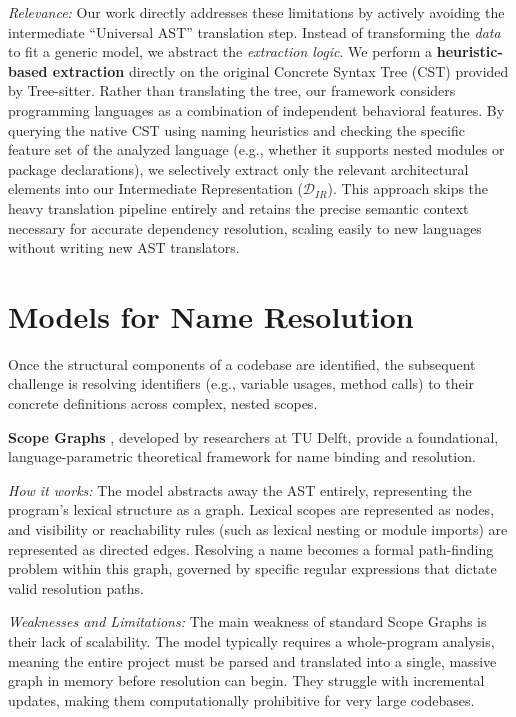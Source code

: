 \textit{Relevance:} Our work directly addresses these limitations by
actively avoiding the intermediate ``Universal AST'' translation step.
Instead of transforming the \textit{data} to fit a generic model, we
abstract the \textit{extraction logic}. We perform a
\textbf{heuristic-based extraction} directly on the original Concrete
Syntax Tree (CST) provided by Tree-sitter. Rather than translating the
tree, our framework considers programming languages as a combination
of independent behavioral features. By querying the native CST using
naming heuristics and checking the specific feature set of the
analyzed language (e.g., whether it supports nested modules or
package declarations), we selectively extract only the relevant
architectural elements into our Intermediate Representation
($\mathcal{D}_{IR}$).
This approach skips the heavy translation pipeline entirely and retains
the precise semantic context necessary for accurate dependency resolution,
scaling easily to new languages without writing new AST translators.

\section{Models for Name Resolution}

Once the structural components of a codebase are identified, the
subsequent challenge is resolving identifiers (e.g., variable usages,
method calls) to their concrete definitions across complex, nested scopes.

\textbf{Scope Graphs} \cite{zwaan_scope_2023}, developed by
researchers at TU Delft, provide a foundational, language-parametric
theoretical framework for name binding and resolution.

\textit{How it works:} The model abstracts away the AST entirely,
representing the program's lexical structure as a graph. Lexical
scopes are represented as nodes, and visibility or reachability rules
(such as lexical nesting or module imports) are represented as
directed edges. Resolving a name becomes a formal path-finding
problem within this graph, governed by specific regular expressions
that dictate valid resolution paths.

\textit{Weaknesses and Limitations:} The main weakness of standard
Scope Graphs is their lack of scalability. The model typically
requires a whole-program analysis, meaning the entire project must be
parsed and translated into a single, massive graph in memory before
resolution can begin. They struggle with incremental updates, making
them computationally prohibitive for very large codebases.

